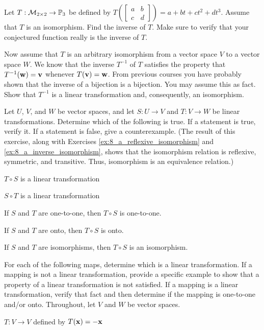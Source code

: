 \item Let $T: \mathcal{M}_{2 \times 2} \to \mathbb{P}_3$ be defined by $T\left(\left[ \begin{array}{cc} a&b\\ c&d \end{array} \right] \right) = a+bt+ct^2+dt^3$. Assume that $T$ is an isomorphism. Find the inverse of $T$. Make sure to verify that your conjectured function really is the inverse of $T$. 
	
\item Now assume that $T$ is an arbitrary isomorphism from a vector space $V$ to a vector space $W$. We know that the inverse $T^{-1}$ of $T$ satisfies the property that $T^{-1}(\mathbf{w}) = \mathbf{v}$ whenever $T(\mathbf{v}) = \mathbf{w}$. From previous courses you have probably shown that the inverse of a bijection is a bijection. You may assume this as fact. Show that $T^{-1}$ is a linear transformation and, consequently, an isomorphism. 

\ea


\item Let $U$, $V$, and $W$ be vector spaces, and let $S : U \to V$ and $T : V \to W$ be linear transformations. Determine which of the following is true. If a statement is true, verify it. If a statement is false, give a counterexample. (The result of this exercise, along with Exercises \ref{ex:8_a_reflexive_isomorphism} and \ref{ex:8_a_inverse_isomorphism}, shows that the isomorphism relation is reflexive, symmetric, and transitive. Thus, isomorphism is an equivalence relation.) 
	\ba
	\item $T \circ S$ is a linear transformation
	\item $S \circ T$ is a linear transformation
	\item If $S$ and $T$ are one-to-one, then $T \circ S$ is one-to-one.
	\item If $S$ and $T$ are onto, then $T \circ S$ is onto.
	\item If $S$ and $T$ are isomorphisms, then $T \circ S$ is an isomorphism.
	\ea
	

\item For each of the following maps, determine which is a linear transformation. If a mapping is not a linear transformation, provide a specific example to show that a property of a linear transformation is not satisfied. If a mapping is a linear transformation, verify that fact and then determine if the mapping is one-to-one and/or onto. Throughout, let $V$ and $W$ be vector spaces.
     \ba

     \item $T: V \to V$ defined by $T(\mathbf{x}) = -\mathbf{x}$ 
     
